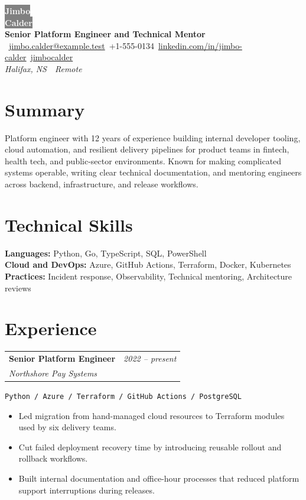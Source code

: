 \documentclass[10pt]{article}
\makeatletter
\newcommand{\tech}[1]{\textcolor{secondary}{\textbf{#1}}}
\newcommand{\experience}[4]{%
  \vspace{4pt}
  \begin{tabular*}{\textwidth}{@{}l@{\extracolsep{\fill}}r@{}}
    \textbf{#1} & \textit{#2} \\
    \textit{\small#3} & \textit{\small#4}
  \end{tabular*}
  \vspace{-4pt}
}
\makeatother
\begin{document}
\begin{center}
\colorbox{gray}{\HUGE\textcolor{white}{\textbf{Jimbo}}} \\[2pt]
\colorbox{gray}{\HUGE\textcolor{white}{\textbf{Calder}}} \\[6pt]
    {\Large \tech{Senior Platform Engineer and Technical Mentor}} \\[6pt]
    ~\href{mailto:jimbo.calder@example.test}{jimbo.calder@example.test}\hfill {}~+1-555-0134\hfill {}~\href{https://linkedin.com/in/jimbo-calder}{linkedin.com/in/jimbo-calder}\hfill {}~\href{https://github.com/jimbocalder}{jimbocalder}
    \\[2pt]
    \textit{Halifax, NS}~\textbullet~\textit{Remote}
\end{center}

\section*{Summary}

Platform engineer with 12 years of experience building internal developer tooling, cloud automation, and resilient delivery pipelines for product teams in fintech, health tech, and public-sector environments. Known for making complicated systems operable, writing clear technical documentation, and mentoring engineers across backend, infrastructure, and release workflows.

\section*{Technical Skills}
\textbf{Languages:} Python, Go, TypeScript, SQL, PowerShell \\
\textbf{Cloud and DevOps:} Azure, GitHub Actions, Terraform, Docker, Kubernetes \\
\textbf{Practices:} Incident response, Observability, Technical mentoring, Architecture reviews \\

\section*{Experience}

\experience{Senior Platform Engineer}{2022 -- present}{Northshore Pay Systems}{}
\hspace{0.5cm}\texttt{Python / Azure / Terraform / GitHub Actions / PostgreSQL}
\begin{itemize}
    \item Led migration from hand-managed cloud resources to Terraform modules used by six delivery teams.
    \item Cut failed deployment recovery time by introducing reusable rollout and rollback workflows.
    \item Built internal documentation and office-hour processes that reduced platform support interruptions during releases.
\end{itemize}
\end{document}
